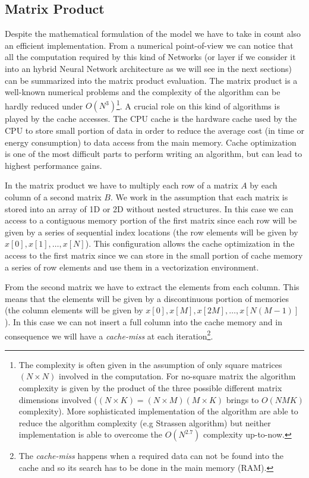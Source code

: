 \documentclass{standalone}
\begin{document}
\subsection[Matrix Product]{Matrix Product}\label{NN:gemm}

Despite the mathematical formulation of the model we have to take in count also an efficient implementation.
From a numerical point-of-view we can notice that all the computation required by this kind of Networks (or layer if we consider it into an hybrid Neural Network architecture as we will see in the next sections) can be summarized into the matrix product evaluation.
The matrix product is a well-known numerical problems and the complexity of the algorithm can be hardly reduced under $O(N^3)$\footnote{
  The complexity is often given in the assumption of only square matrices $(N\times N)$ involved in the computation.
  For no-square matrix the algorithm complexity is given by the product of the three possible different matrix dimensions involved ($(N\times K) = (N\times M)(M\times K)$ brings to $O(NMK)$ complexity).
  More sophisticated implementation of the algorithm are able to reduce the algorithm complexity (e.g Strassen algorithm) but neither implementation is able to overcome the $O(N^{2.7})$ complexity up-to-now.
}.
A crucial role on this kind of algorithms is played by the cache accesses.
The CPU cache is the hardware cache used by the CPU to store small portion of data in order to reduce the average cost (in time or energy consumption) to data access from the main memory.
Cache optimization is one of the most difficult parts to perform writing an algorithm, but can lead to highest performance gains.

In the matrix product we have to multiply each row of a matrix $A$ by each column of a second matrix $B$.
We work in the assumption that each matrix is stored into an array of 1D or 2D without nested structures.
In this case we can access to a contiguous memory portion of the first matrix since each row will be given by a series of sequential index locations (the row elements will be given by $x[0], x[1], \dots, x[N]$).
This configuration allows the cache optimization in the access to the first matrix since we can store in the small portion of cache memory a series of row elements and use them in a vectorization environment.

From the second matrix we have to extract the elements from each column.
This means that the elements will be given by a discontinuous portion of memories (the column elements will be given by $x[0], x[M], x[2M], \dots, x[N(M-1)]$).
In this case we can not insert a full column into the cache memory and in consequence we will have a \emph{cache-miss} at each iteration\footnote{
  The \emph{cache-miss} happens when a required data can not be found into the cache and so its search has to be done in the main memory (RAM).
}.
\end{document}
